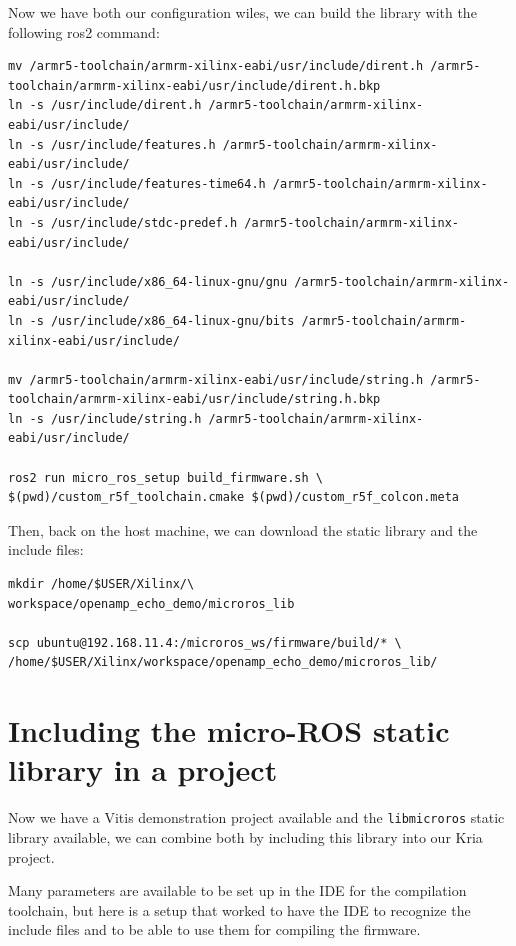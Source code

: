 \documentclass[10pt]{article}
\begin{document}
Now we have both our configuration wiles, we can build the library with the following ros2 command:
\begin{tcolorbox}
\begin{verbatim}
mv /armr5-toolchain/armrm-xilinx-eabi/usr/include/dirent.h /armr5-toolchain/armrm-xilinx-eabi/usr/include/dirent.h.bkp
ln -s /usr/include/dirent.h /armr5-toolchain/armrm-xilinx-eabi/usr/include/
ln -s /usr/include/features.h /armr5-toolchain/armrm-xilinx-eabi/usr/include/
ln -s /usr/include/features-time64.h /armr5-toolchain/armrm-xilinx-eabi/usr/include/
ln -s /usr/include/stdc-predef.h /armr5-toolchain/armrm-xilinx-eabi/usr/include/

ln -s /usr/include/x86_64-linux-gnu/gnu /armr5-toolchain/armrm-xilinx-eabi/usr/include/
ln -s /usr/include/x86_64-linux-gnu/bits /armr5-toolchain/armrm-xilinx-eabi/usr/include/

mv /armr5-toolchain/armrm-xilinx-eabi/usr/include/string.h /armr5-toolchain/armrm-xilinx-eabi/usr/include/string.h.bkp
ln -s /usr/include/string.h /armr5-toolchain/armrm-xilinx-eabi/usr/include/

ros2 run micro_ros_setup build_firmware.sh \
$(pwd)/custom_r5f_toolchain.cmake $(pwd)/custom_r5f_colcon.meta
\end{verbatim}
\end{tcolorbox}

Then, back on the host machine, we can download the static library and the include files:
\begin{tcolorbox}
\begin{verbatim}
mkdir /home/$USER/Xilinx/\
workspace/openamp_echo_demo/microros_lib

scp ubuntu@192.168.11.4:/microros_ws/firmware/build/* \
/home/$USER/Xilinx/workspace/openamp_echo_demo/microros_lib/
\end{verbatim}
\end{tcolorbox}



\section{Including the micro-ROS static library in a project}
Now we have a Vitis demonstration project available and the \verb|libmicroros| static library
available, we can combine both by including this library into our Kria project.

Many parameters are available to be set up in the IDE for the compilation toolchain, but here is
a setup that worked to have the IDE to recognize the include files and to be able to use them
for compiling the firmware.
\end{document}
